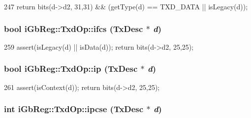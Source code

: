 \begin{DoxyCode}
247 { return bits(d->d2, 31,31) && (getType(d) == TXD_DATA || isLegacy(d)); }
\end{DoxyCode}
\hypertarget{namespaceiGbReg_1_1TxdOp_a49dc5f1335d0bf1b0b00364d4bf67402}{
\subsubsection[{ifcs}]{\setlength{\rightskip}{0pt plus 5cm}bool iGbReg::TxdOp::ifcs (TxDesc $\ast$ {\em d})}}
\label{namespaceiGbReg_1_1TxdOp_a49dc5f1335d0bf1b0b00364d4bf67402}



\begin{DoxyCode}
259 { assert(isLegacy(d) || isData(d)); return bits(d->d2, 25,25); }
\end{DoxyCode}
\hypertarget{namespaceiGbReg_1_1TxdOp_a95c40243f7e4760653e10ce95673f381}{
\subsubsection[{ip}]{\setlength{\rightskip}{0pt plus 5cm}bool iGbReg::TxdOp::ip (TxDesc $\ast$ {\em d})}}
\label{namespaceiGbReg_1_1TxdOp_a95c40243f7e4760653e10ce95673f381}



\begin{DoxyCode}
261 { assert(isContext(d)); return bits(d->d2, 25,25); }
\end{DoxyCode}
\hypertarget{namespaceiGbReg_1_1TxdOp_a94ed3e1271c637556a5c15cf582f8214}{
\subsubsection[{ipcse}]{\setlength{\rightskip}{0pt plus 5cm}int iGbReg::TxdOp::ipcse (TxDesc $\ast$ {\em d})}}
\label{namespaceiGbReg_1_1TxdOp_a94ed3e1271c637556a5c15cf582f8214}



